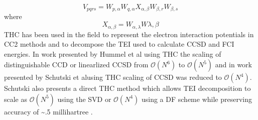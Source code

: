 			\begin{equation}
				V_{pqrs} = W_{p, \alpha} W_{q, \alpha} X_{\alpha, \beta} W_{\beta, r} W_{\beta, s}
			\end{equation}
		where
			\begin{equation}
				X_{\alpha, \beta} = W_{\alpha, \lambda} W{\lambda, \beta}
			\end{equation}
		THC has been used in the field to represent the electron interaction potentials in CC2 methods and to decompose the TEI used to calculate CCSD and FCI energies. In work presented by Hummel et al\cite{Hummel2016} using THC the scaling of distinguishable CCD or linearlized CCSD from $\mathcal{O}(N^6)$ to $\mathcal{O}(N^5)$ and in work presented by Schutski et al\cite{Schutski2017}using THC scaling of CCSD was reduced to $\mathcal{O}(N^4)$. Schutski also presents a direct THC method which allows TEI decomposition to scale as $\mathcal{O}(N^5)$ using the SVD or $\mathcal{O}(N^4)$ using a DF scheme while preserving accuracy of \textasciitilde.5 millihartree .
